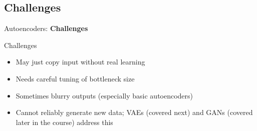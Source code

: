 \subsection{Challenges}
\begin{frame}{}
    \LARGE Autoencoders: \textbf{Challenges}
\end{frame}

\begin{frame}{Challenges}
    \begin{itemize}
        \item May just copy input without real learning
        \item Needs careful tuning of bottleneck size
        \item Sometimes blurry outputs (especially basic autoencoders)
        \item Cannot reliably generate new data; VAEs (covered next) and GANs (covered later in the course) address this
    \end{itemize}
\end{frame}